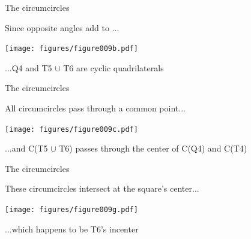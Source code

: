 \documentclass[14pt]{beamer}
\begin{document}

    \begin{frame}{The circumcircles}
        \begin{center}
            Since opposite angles add to \textpi...
        \end{center}
        \vspace{0.4em}
        \hspace{5.25em} \texttt{[image: figures/figure009b.pdf]} \\
        \begin{center}
            ...Q4 and T5 $\cup$ T6 are cyclic quadrilaterals
        \end{center}
    \end{frame}


    \begin{frame}{The circumcircles}
        \begin{center}
            All circumcircles pass through a common point...
        \end{center}
        \hspace{3.92em} \texttt{[image: figures/figure009c.pdf]} \\
        \begin{center}
            \footnotesize ...and C(T5 $\cup$ T6) passes through the center of C(Q4) and C(T4)
        \end{center}
    \end{frame}


    \begin{frame}{The circumcircles}
        \begin{center}
            These circumcircles intersect at the square's center...
        \end{center}
        \vspace{0.90em}
        \hspace{5.25em} \texttt{[image: figures/figure009g.pdf]} \\
        \begin{center}
            ...which happens to be T6's incenter
        \end{center}
    \end{frame}

\end{document}
